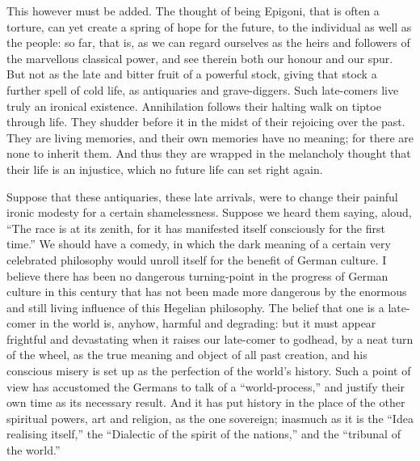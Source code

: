 This however must be added. The thought of being Epigoni, that is
often a torture, can yet create a spring of hope for the future, to
the individual as well as the people: so far, that is, as we can
regard ourselves as the heirs and followers of the marvellous
classical power, and see therein both our honour and our spur. But
not as the late and bitter fruit of a powerful stock, giving that
stock a further spell of cold life, as antiquaries and grave-diggers.
Such late-comers live truly an ironical existence. Annihilation
follows their halting walk on tiptoe through life. They shudder
before it in the midst of their rejoicing over the past. They are
living memories, and their own memories have no meaning; for there
are none to inherit them. And thus they are wrapped in the melancholy
thought that their life is an injustice, which no future life can set
right again.

Suppose that these antiquaries, these late arrivals, were to change
their painful ironic modesty for a certain shamelessness. Suppose we
heard them saying, aloud, \enquote{The race is at its zenith, for it has
manifested itself consciously for the first time.} We should have a
comedy, in which the dark meaning of a certain very celebrated
philosophy would unroll itself for the benefit of German culture. I
believe there has been no dangerous turning-point in the progress of
German culture in this century that has not been made more dangerous
by the enormous and still living influence of this Hegelian
philosophy. The belief that one is a late-comer in the world is,
anyhow, harmful and degrading: but it must appear frightful and
devastating when it raises our late-comer to godhead, by a neat turn
of the wheel, as the true meaning and object of all past creation,
and his conscious misery is set up as the perfection of the world's
history. Such a point of view has accustomed the Germans to talk of a
\enquote{world-process,} and justify their own time as its necessary result.
And it has put history in the place of the other spiritual powers,
art and religion, as the one sovereign; inasmuch as it is the \enquote{Idea
realising itself,} the \enquote{Dialectic of the spirit of the nations,} and
the \enquote{tribunal of the world.}

